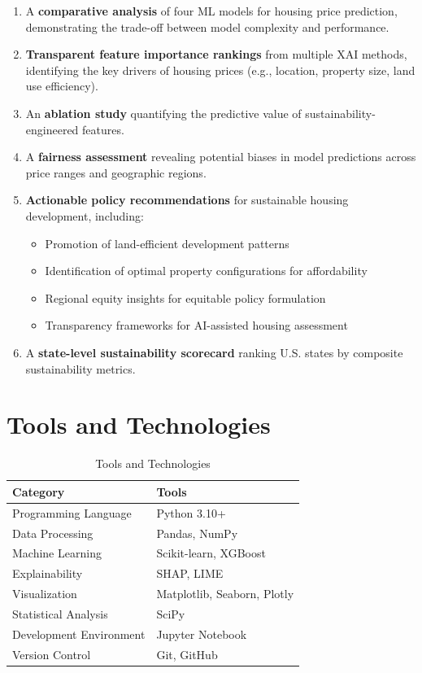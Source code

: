 \documentclass[12pt, a4paper]{article}
\begin{document}
\begin{enumerate}[label=\arabic*.]
    \item A \textbf{comparative analysis} of four ML models for housing price prediction, demonstrating the trade-off between model complexity and performance.
    
    \item \textbf{Transparent feature importance rankings} from multiple XAI methods, identifying the key drivers of housing prices (e.g., location, property size, land use efficiency).
    
    \item An \textbf{ablation study} quantifying the predictive value of sustainability-engineered features.
    
    \item A \textbf{fairness assessment} revealing potential biases in model predictions across price ranges and geographic regions.
    
    \item \textbf{Actionable policy recommendations} for sustainable housing development, including:
    \begin{itemize}
        \item Promotion of land-efficient development patterns
        \item Identification of optimal property configurations for affordability
        \item Regional equity insights for equitable policy formulation
        \item Transparency frameworks for AI-assisted housing assessment
    \end{itemize}
    
    \item A \textbf{state-level sustainability scorecard} ranking U.S. states by composite sustainability metrics.
\end{enumerate}

\section{Tools and Technologies}

\begin{table}[H]
\centering
\caption{Tools and Technologies}
\begin{tabular}{ll}
\toprule
\textbf{Category} & \textbf{Tools} \\
\midrule
Programming Language & Python 3.10+ \\
Data Processing & Pandas, NumPy \\
Machine Learning & Scikit-learn, XGBoost \\
Explainability & SHAP, LIME \\
Visualization & Matplotlib, Seaborn, Plotly \\
Statistical Analysis & SciPy \\
Development Environment & Jupyter Notebook \\
Version Control & Git, GitHub \\
\bottomrule
\end{tabular}
\end{table}
\end{document}

